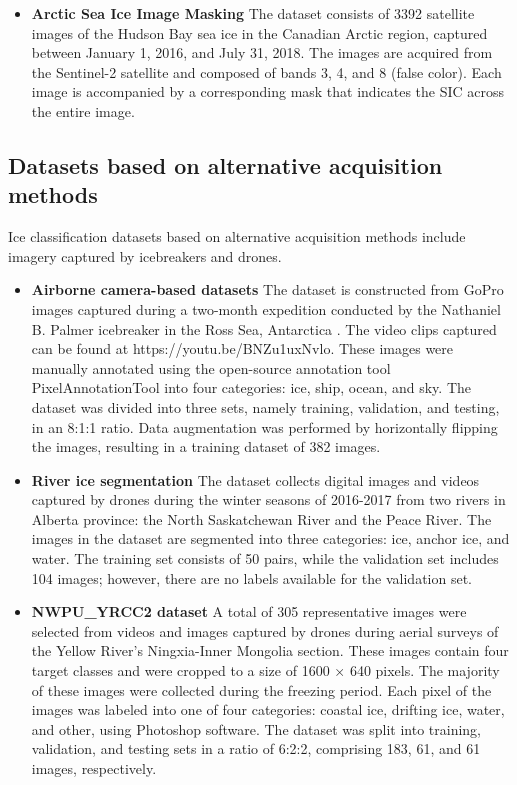 \begin{itemize}
\item \textbf{Arctic Sea Ice Image Masking} The dataset consists of 3392 satellite images of the Hudson Bay sea ice in the Canadian Arctic region, captured between January 1, 2016, and July 31, 2018. The images are acquired from the Sentinel-2 satellite and composed of bands 3, 4, and 8 (false color). Each image is accompanied by a corresponding mask that indicates the SIC across the entire image.
\end{itemize}

\subsection {Datasets based on alternative acquisition methods}

Ice classification datasets based on alternative acquisition methods include imagery captured by icebreakers and drones.

\begin{itemize}
\item \textbf{Airborne camera-based datasets} The dataset is constructed from GoPro images captured during a two-month expedition conducted by the Nathaniel B. Palmer icebreaker in the Ross Sea, Antarctica \cite{134dowden2020sea}. The video clips captured can be found at https://youtu.be/BNZu1uxNvlo. These images were manually annotated using the open-source annotation tool PixelAnnotationTool into four categories: ice, ship, ocean, and sky. The dataset was divided into three sets, namely training, validation, and testing, in an 8:1:1 ratio. Data augmentation was performed by horizontally flipping the images, resulting in a training dataset of 382 images.
\end{itemize}

\begin{itemize}
\item \textbf{River ice segmentation\cite{145singh2020river}} The dataset collects digital images and videos captured by drones during the winter seasons of 2016-2017 from two rivers in Alberta province: the North Saskatchewan River and the Peace River. The images in the dataset are segmented into three categories: ice, anchor ice, and water. The training set consists of 50 pairs, while the validation set includes 104 images; however, there are no labels available for the validation set.
\end{itemize}

\begin{itemize}
\item \textbf{NWPU\_YRCC2 dataset} A total of 305 representative images were selected from videos and images captured by drones during aerial surveys of the Yellow River's Ningxia-Inner Mongolia section. These images contain four target classes and were cropped to a size of 1600 × 640 pixels. The majority of these images were collected during the freezing period. Each pixel of the images was labeled into one of four categories: coastal ice, drifting ice, water, and other, using Photoshop software. The dataset was split into training, validation, and testing sets in a ratio of 6:2:2, comprising 183, 61, and 61 images, respectively.
\end{itemize}

